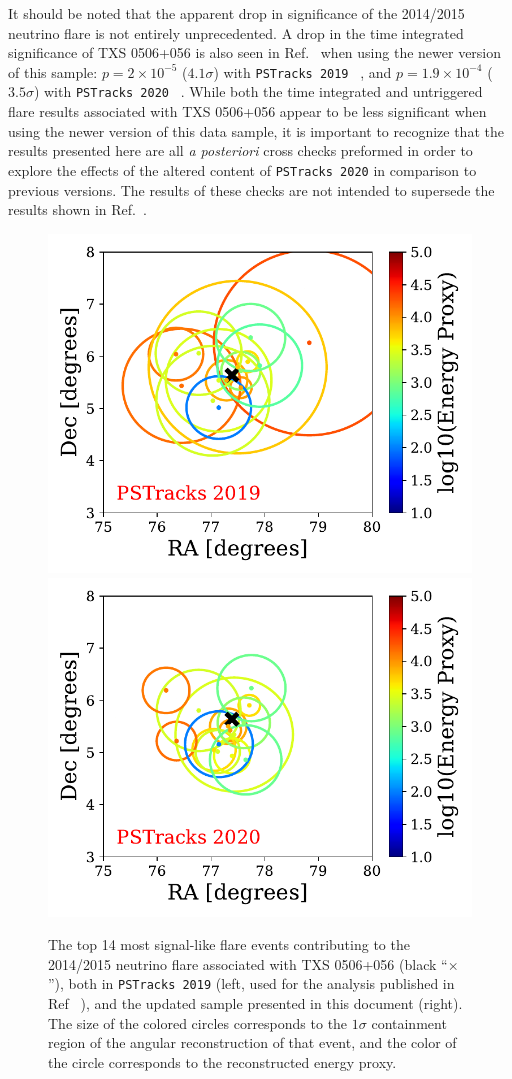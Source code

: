 \documentclass[aps,10pt,prd,twocolumn,floats,letterpaper,showpacs,nofootinbib,bibnotes,notitlepage,superscriptaddress,floatfix]{revtex4-1}
\begin{document}
 It should be noted that the apparent drop in significance of the 2014/2015 neutrino flare is not entirely unprecedented. A drop in the time integrated significance of TXS 0506+056 is also seen in Ref.~\cite{Aartsen:2019fau} when using the newer version of this sample: $p=2 \times 10^{-5}$ ($4.1\sigma$) with {\tt PSTracks 2019} ~\cite{IceCube:2018cha}, and $p=1.9 \times 10^{-4}$ ($3.5\sigma$) with {\tt PSTracks 2020} ~\cite{Aartsen:2019fau}. While both the time integrated and untriggered flare results associated with TXS 0506+056 appear to be less significant when using the newer version of this data sample, it is important to recognize that the results presented here are all \textit{a posteriori} cross checks preformed in order to explore the effects of the altered content of {\tt PSTracks 2020} in comparison to previous versions. The results of these checks are not intended to supersede the results shown in Ref.~\cite{IceCube:2018cha}.

\begin{figure}[p]
\centering
 \includegraphics[width=.45\linewidth]{./TXSCheckPlots/PSTracksv2evtplot.pdf}\hspace{0.2in}\includegraphics[width=.45\linewidth]{./TXSCheckPlots/PSTracksv3evtplot.pdf}
\caption[]{The top 14 most signal-like flare events contributing to the 2014/2015 neutrino flare associated with TXS 0506+056 (black ``$\times$''), both in {\tt PSTracks 2019} (left, used for the analysis published in Ref ~\cite{IceCube:2018cha}), and the updated sample presented in this document (right). The size of the colored circles corresponds to the $1\sigma$ containment region of the angular reconstruction of that event, and the color of the circle corresponds to the reconstructed energy proxy.}\label{fig:TXSEvtsCompare}
\end{figure}
\end{document}
